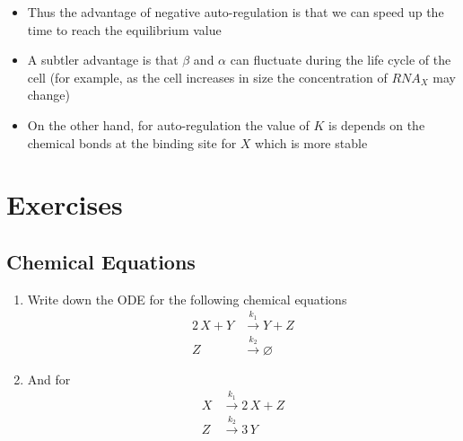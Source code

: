 \documentclass[11pt]{article}
\newcommand{\RNA}{\mathit{RNA}}
\begin{document}
\begin{itemize}
\begin{enumerate}
\begin{itemize}
\begin{itemize}
of \(X\)
\item The steady state in this case is determined by \(K\) (as
opposed to \(\hat{\beta}\) when we have no auto-regulation)
\item We can make this reaction as fast as we like by increasing \(\beta\)
\item This isn't possible for the case without auto-regulation
because when we increase \(\beta\) we change the steady
state and our time to reach the steady state is just the same
\end{itemize}
\item Thus the advantage of negative auto-regulation is that we can speed
up the time to reach the equilibrium value
\item A subtler advantage is that \(\beta\) and \(\alpha\) can
fluctuate during the life cycle of the cell (for example, as
the cell increases in size the concentration of \(\RNA_X\) may change)
\item On the other hand, for auto-regulation the value of \(K\) is
depends on the chemical bonds at the binding site for \(X\)
which is more stable
\end{itemize}
\end{enumerate}
\end{itemize}

\section{Exercises}
\label{sec:org1ab0a50}

\subsection{Chemical Equations}
\label{sec:orga6b3c71}
\begin{enumerate}
\item Write down the ODE for the following chemical equations
\begin{align*}
 2\, X + Y  &\stackrel{k_1}{\longrightarrow} Y + Z\\
 Z &\stackrel{k_2}{\longrightarrow} \varnothing
\end{align*}
\item And for
 \begin{align*}
 X  &\stackrel{k_1}{\longrightarrow} 2\,X + Z\\
 Z &\stackrel{k_2}{\longrightarrow} 3\,Y
\end{align*}
\end{enumerate}
\end{document}
